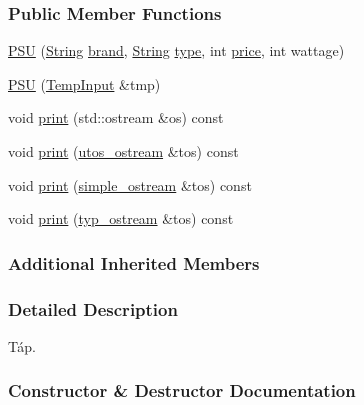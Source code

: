 \subsubsection*{Public Member Functions}
\begin{DoxyCompactItemize}
\item 
\mbox{\hyperlink{class_p_s_u_a1077b85dde400327880d6f37ebaeef49}{P\+SU}} (\mbox{\hyperlink{class_string}{String}} \mbox{\hyperlink{class_part_ae06f2fdeb7fbbdb229a7aca151f3e341}{brand}}, \mbox{\hyperlink{class_string}{String}} \mbox{\hyperlink{class_part_a101dbcc5c4b21564df7414c7eb0eae88}{type}}, int \mbox{\hyperlink{class_part_a8e71223aed1da95a974f33d8d6c91bb1}{price}}, int wattage)
\item 
\mbox{\hyperlink{class_p_s_u_a2e8661030cac1d31c85deeb9f7763567}{P\+SU}} (\mbox{\hyperlink{struct_temp_input}{Temp\+Input}} \&tmp)
\item 
void \mbox{\hyperlink{class_p_s_u_ad8f95676e09f5ba805dbba50759f44ba}{print}} (std\+::ostream \&os) const
\item 
void \mbox{\hyperlink{class_p_s_u_a81c74aa3a327003c58b89ca2b8602c1d}{print}} (\mbox{\hyperlink{structutos__ostream}{utos\+\_\+ostream}} \&tos) const
\item 
void \mbox{\hyperlink{class_p_s_u_a57f14e0dee163f33d01cdbb159b6d9d6}{print}} (\mbox{\hyperlink{structsimple__ostream}{simple\+\_\+ostream}} \&tos) const
\item 
void \mbox{\hyperlink{class_p_s_u_a3690cd51ec36d4a1417c22612793e01c}{print}} (\mbox{\hyperlink{structtyp__ostream}{typ\+\_\+ostream}} \&tos) const
\end{DoxyCompactItemize}
\subsubsection*{Additional Inherited Members}


\subsubsection{Detailed Description}
Táp. 

\subsubsection{Constructor \& Destructor Documentation}
\mbox{\label{class_p_s_u_a1077b85dde400327880d6f37ebaeef49}} 
